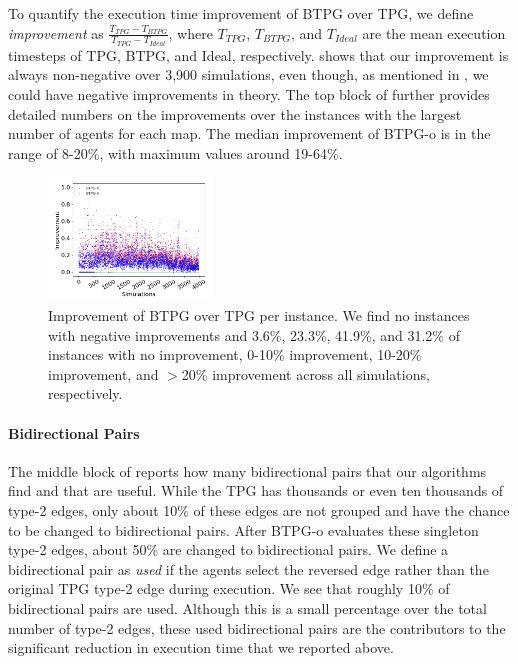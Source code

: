 \documentclass[letterpaper]{article} %
\theoremstyle{definition}
\begin{document}
To quantify the execution time improvement of BTPG over TPG, we define \emph{improvement} as $\frac{T_{TPG} - T_{BTPG}}{T_{TPG}-T_{Ideal}}$, where $T_{TPG}$, $T_{BTPG}$, and $T_{Ideal}$ are the mean execution timesteps of TPG, BTPG, and Ideal, respectively.  shows that our improvement is always non-negative over 3,900 simulations, even though, as mentioned in , we could have negative improvements in theory. The top block of  further provides detailed numbers on the improvements over the instances with the largest number of agents for each map. The median improvement of BTPG-o is in the range of 8-20\%, with maximum values around 19-64\%.


\begin{figure}[t!]
     \centering
     \includegraphics[width=0.39\textwidth]{Figs/scatter.png}
     \caption{Improvement of BTPG over TPG per instance. We find no instances with negative improvements and 3.6\%, 23.3\%,  41.9\%, and 31.2\% of instances with no improvement, 0-10\% improvement, 10-20\% improvement, and $>$20\% improvement across all simulations, respectively.}
     \label{fig:scatter plot}
 \end{figure}

\paragraph{Bidirectional Pairs} The middle block of  reports how many bidirectional pairs that our algorithms find and that are useful. While the TPG has thousands or even ten thousands of type-2 edges, only about 10\% of these edges are not grouped and have the chance to be changed to bidirectional pairs. After BTPG-o evaluates these singleton type-2 edges, about 50\% are changed to bidirectional pairs. We define a bidirectional pair as \emph{used} if the agents select the reversed edge rather than the original TPG type-2 edge during execution. We see that roughly 10\% of bidirectional pairs are used. Although this is a small percentage over the total number of type-2 edges, these used bidirectional pairs are the contributors to the significant reduction in execution time that we reported above.
\end{document}
